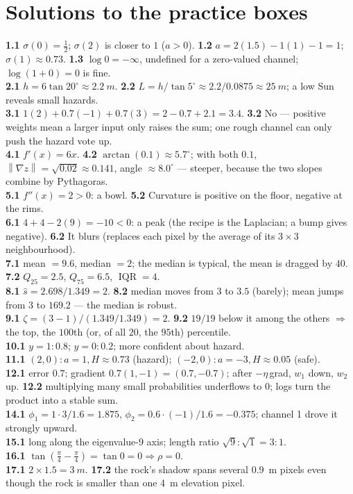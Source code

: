 \documentclass[11pt,oneside]{book}
\newcommand{\norm}[1]{\left\lVert #1\right\rVert}
\begin{document}
\chapter{Solutions to the practice boxes}
\small
\textbf{1.1} $\sigma(0)=\tfrac12$; $\sigma(2)$ is closer to $1$ ($a>0$).\quad
\textbf{1.2} $a=2(1.5)-1(1)-1=1$; $\sigma(1)\approx0.73$.\quad
\textbf{1.3} $\log 0=-\infty$, undefined for a zero-valued channel; $\log(1+0)=0$ is fine.\\
\textbf{2.1} $h=6\tan20^\circ\approx\SI{2.2}{m}$.\quad
\textbf{2.2} $L=h/\tan5^\circ\approx 2.2/0.0875\approx\SI{25}{m}$; a low Sun reveals small hazards.\\
\textbf{3.1} $1(2)+0.7(-1)+0.7(3)=2-0.7+2.1=3.4$.\quad
\textbf{3.2} No --- positive weights mean a larger input only raises the sum; one rough channel can only push the hazard vote up.\\
\textbf{4.1} $f'(x)=6x$.\quad
\textbf{4.2} $\arctan(0.1)\approx5.7^\circ$; with both $0.1$, $\norm{\nabla z}=\sqrt{0.02}\approx0.141$, angle $\approx8.0^\circ$ --- steeper, because the two slopes combine by Pythagoras.\\
\textbf{5.1} $f''(x)=2>0$: a bowl.\quad
\textbf{5.2} Curvature is positive on the floor, negative at the rims.\\
\textbf{6.1} $4+4-2(9)=-10<0$: a peak (the recipe is the Laplacian; a bump gives negative).\quad
\textbf{6.2} It blurs (replaces each pixel by the average of its $3\times3$ neighbourhood).\\
\textbf{7.1} mean $=9.6$, median $=2$; the median is typical, the mean is dragged by $40$.\quad
\textbf{7.2} $Q_{25}=2.5$, $Q_{75}=6.5$, $\operatorname{IQR}=4$.\\
\textbf{8.1} $\hat s=2.698/1.349=2$.\quad
\textbf{8.2} median moves from $3$ to $3.5$ (barely); mean jumps from $3$ to $169.2$ --- the median is robust.\\
\textbf{9.1} $\zeta=(3-1)/(1.349/1.349)=2$.\quad
\textbf{9.2} $19/19$ below it among the others $\Rightarrow$ the top, the $100$th (or, of all $20$, the $95$th) percentile.\\
\textbf{10.1} $y=1\!:0.8$; $y=0\!:0.2$; more confident about hazard.\\
\textbf{11.1} $(2,0)\!:a=1,H\approx0.73$ (hazard); $(-2,0)\!:a=-3,H\approx0.05$ (safe).\\
\textbf{12.1} error $0.7$; gradient $0.7(1,-1)=(0.7,-0.7)$; after $-\eta\,$grad, $w_1$ down, $w_2$ up.\quad
\textbf{12.2} multiplying many small probabilities underflows to $0$; logs turn the product into a stable sum.\\
\textbf{14.1} $\phi_1=1\cdot3/1.6=1.875$, $\phi_2=0.6\cdot(-1)/1.6=-0.375$; channel 1 drove it strongly upward.\\
\textbf{15.1} long along the eigenvalue-$9$ axis; length ratio $\sqrt9:\sqrt1=3:1$.\\
\textbf{16.1} $\tan(\tfrac{\pi}{4}-\tfrac{\pi}{4})=\tan0=0\Rightarrow\rho=0$.\\
\textbf{17.1} $2\times1.5=\SI{3}{m}$.\quad
\textbf{17.2} the rock's shadow spans several \SI{0.9}{m} pixels even though the rock is smaller than one \SI{4}{m} elevation pixel.
\end{document}
